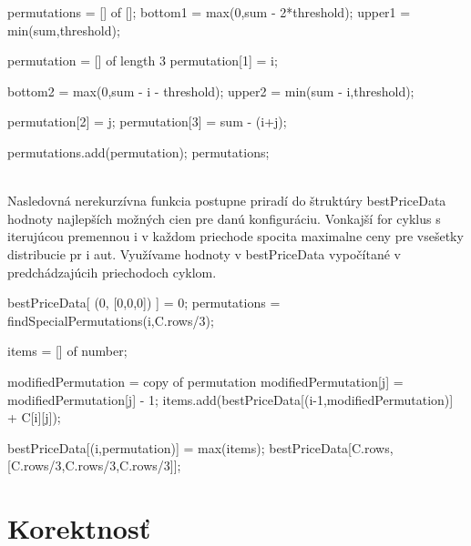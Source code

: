 \documentclass[paper=a4, fontsize=11pt]{scrartcl} %
\numberwithin{equation}{section} %
\numberwithin{figure}{section} %
\numberwithin{table}{section} %
\begin{document}
\begin{algorithmic}
		\State \Return [0,0,0]
	\EndIf
	\State permutations = [] of [];
	\State bottom1 = max(0,sum - 2*threshold);
	\State upper1 = min(sum,threshold);
	
		\State permutation = [] of length 3
		\State permutation[1] = i;
		
		\State bottom2 = max(0,sum - i - threshold);
		\State upper2 = min(sum - i,threshold);
		
			\State permutation[2] = j;
			\State permutation[3] = sum - (i+j);
		\EndFor
		
		
		permutations.add(permutation);
	\EndFor
	\State \Return permutations;
\EndFunction
\end{algorithmic}
\ \\
Nasledovná nerekurzívna funkcia postupne priradí do štruktúry bestPriceData hodnoty najlepších možných cien pre danú konfiguráciu.
Vonkajší for cyklus s iterujúcou premennou i v každom priechode spocita maximalne ceny pre vsešetky distribucie pr i aut.
Využívame hodnoty v bestPriceData vypočítané v predchádzajúcih priechodoch cyklom. \ \\


\begin{algorithmic}[1]
    \State bestPriceData[ (0, [0,0,0]) ] = 0;
        \State permutations = findSpecialPermutations(i,C.rows/3);
	
		
            
            \State items = [] of number;
            
	    	
                \State modifiedPermutation = copy of permutation
		    \State modifiedPermutation[j] = modifiedPermutation[j] - 1;
		    \State items.add(bestPriceData[(i-1,modifiedPermutation)] + C[i][j]);
                 \EndIf
            \EndFor			
		
            \State bestPriceData[(i,permutation)] = max(items);		
        \EndFor
    \EndFor
    \State \Return bestPriceData[C.rows,[C.rows/3,C.rows/3,C.rows/3]];
\EndFunction
\end{algorithmic}

\section*{Korektnosť}
\end{document}
